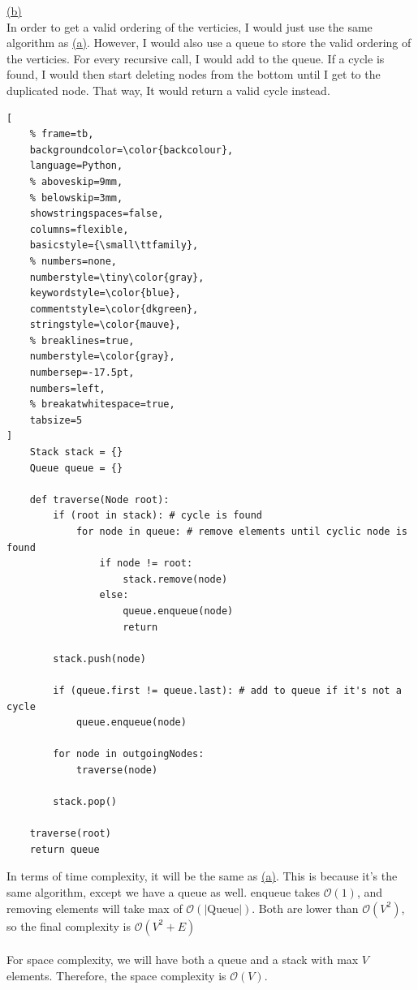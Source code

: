 \documentclass[12pt]{article}
\newcommand{\code}[1]{{\ttfamily \fontseries{b}\selectfont #1}}
\def \calO {\mathcal{O}}
\newcommand{\bigO}[1]{\ensuremath{\calO(#1)}}
\begin{document}
\newpage
\noindent \hyperlink{toc}{\hypertarget{4.1}{(b)}}\\
In order to get a valid ordering of the verticies, I would just use the same algorithm as \hyperlink{4.1}{(a)}. However, I would also use a queue to store the valid ordering of the verticies. For every recursive call, I would add to the queue. If a cycle is found, I would then start deleting nodes from the bottom until I get to the duplicated node. That way, It would return a valid cycle instead. 
\begin{lstlisting}[
	% frame=tb,
	backgroundcolor=\color{backcolour},
	language=Python,
	% aboveskip=9mm,
	% belowskip=3mm,
	showstringspaces=false,
	columns=flexible,
	basicstyle={\small\ttfamily},
	% numbers=none,
	numberstyle=\tiny\color{gray},
	keywordstyle=\color{blue},
	commentstyle=\color{dkgreen},
	stringstyle=\color{mauve},
	% breaklines=true,
	numberstyle=\color{gray},
	numbersep=-17.5pt,  
	numbers=left,
	% breakatwhitespace=true,
	tabsize=5
]
	Stack stack = {}
	Queue queue = {}

	def traverse(Node root):
		if (root in stack): # cycle is found
			for node in queue: # remove elements until cyclic node is found
				if node != root:
					stack.remove(node)
				else:
					queue.enqueue(node)
					return 

		stack.push(node)

		if (queue.first != queue.last): # add to queue if it's not a cycle
			queue.enqueue(node)

		for node in outgoingNodes:
			traverse(node)

		stack.pop()

	traverse(root)
	return queue
\end{lstlisting}
In terms of time complexity, it will be the same as \hyperlink{4.1}{(a)}. This is because it's the same algorithm, except we have a queue as well. \code{enqueue} takes $\calO(1)$, and removing elements will take max of \bigO{|\text{Queue}|}. Both are lower than \bigO{V^2}, so the final complexity is \bigO{V^2 + E}
\\\\
For space complexity, we will have both a queue and a stack with max $V$ elements. Therefore, the space complexity is \bigO{V}.
\end{document}
